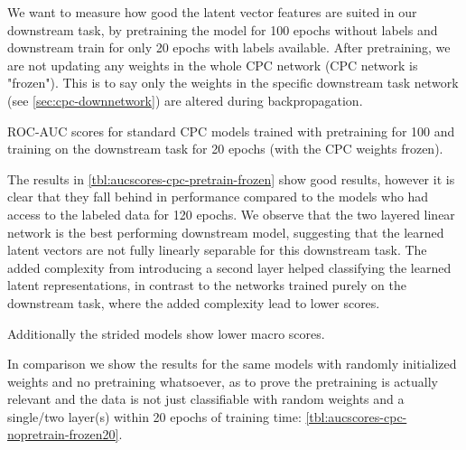 We want to measure how good the latent vector features are suited in our downstream task, by pretraining the model for 100 epochs without labels and downstream train for only 20 epochs with labels available. After pretraining, we are not updating any weights in the whole CPC network (CPC network is "frozen"). This is to say only the weights in the specific downstream task network (see \autoref{sec:cpc-downnetwork}) are altered during backpropagation. 
\begin{table}\centering
	\resizebox{\textwidth}{!}{
		
	}
	\caption*{ ROC-AUC scores for standard CPC models trained with pretraining for 100 and training on the downstream task for 20 epochs (with the CPC weights frozen).} %
	\label{tbl:aucscores-cpc-pretrain-frozen}
\end{table}
The results in \autoref{tbl:aucscores-cpc-pretrain-frozen} show good results, however it is clear that they fall behind in performance compared to the models who had access to the labeled data for 120 epochs. We observe that the two layered linear network is the best performing downstream model, suggesting that the learned latent vectors are not fully linearly separable for this downstream task. The added complexity from introducing a second layer helped classifying the learned latent representations, in contrast to the networks trained purely on the downstream task, where the added complexity lead to lower scores.

Additionally the strided models show lower macro scores.

In comparison we show the results for the same models with randomly initialized weights and no pretraining whatsoever, as to prove the pretraining is actually relevant and the data is not just classifiable with random weights and a single/two layer(s) within 20 epochs of training time: \autoref{tbl:aucscores-cpc-nopretrain-frozen20}. 

